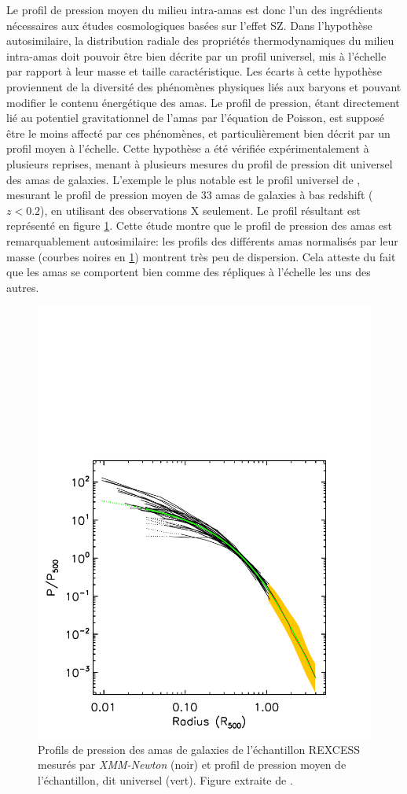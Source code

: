 Le profil de pression moyen du milieu intra-amas est donc l'un des ingrédients nécessaires aux études cosmologiques basées sur l'effet SZ.
Dans l'hypothèse autosimilaire, la distribution radiale des propriétés thermodynamiques du milieu intra-amas doit pouvoir être bien décrite par un profil universel, mis à l'échelle par rapport à leur masse et taille caractéristique.
Les écarts à cette hypothèse proviennent de la diversité des phénomènes physiques liés aux baryons et pouvant modifier le contenu énergétique des amas.
Le profil de pression, étant directement lié au potentiel gravitationnel de l'amas par l'équation de Poisson, est supposé être le moins affecté par ces phénomènes, et particulièrement bien décrit par un profil moyen à l'échelle.
Cette hypothèse a été vérifiée expérimentalement à plusieurs reprises, menant à plusieurs mesures du profil de pression dit universel des amas de galaxies.
L'exemple le plus notable est le profil universel de , mesurant le profil de pression moyen de 33 amas de galaxies à bas redshift ($z < 0.2$), en utilisant des observations X seulement.
Le profil résultant est représenté en figure \ref{fig:a10_upp}.
Cette étude montre que le profil de pression des amas est remarquablement autosimilaire: les profils des différents amas normalisés par leur masse (courbes noires en \ref{fig:a10_upp}) montrent très peu de dispersion.
Cela atteste du fait que les amas se comportent bien comme des répliques à l'échelle les uns des autres.

\begin{figure}[t]
    \centering
    \includegraphics[width=.6\linewidth]{Figures/Chap_nk/Fig_universal.pdf}
    \caption{
        Profils de pression des amas de galaxies de l'échantillon REXCESS mesurés par \textit{XMM-Newton} (noir) et profil de pression moyen de l'échantillon, dit universel (vert).
        Figure extraite de \cite{arnaud_universal_2010}.
    }
    \label{fig:a10_upp}
\end{figure}

